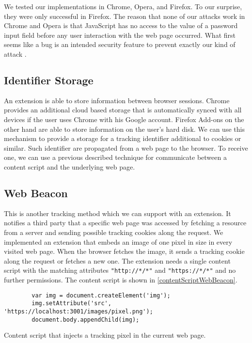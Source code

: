 	We tested our implementations in Chrome, Opera, and Firefox. To our surprise, they were only successful in Firefox. The reason that none of our attacks work in Chrome and Opera is that JavaScript has no access to the value of a password input field before any user interaction with the web page occurred. What first seems like a bug is an intended security feature to prevent exactly our kind of attack \cite{chromiumBlogPasswordInput}.
	
	
	
\subsection{Identifier Storage} 
	
	An extension is able to store information between browser sessions. Chrome provides an additional cloud based storage that is automatically synced with all devices if the user uses Chrome with his Google account. Firefox Add-ons on the other hand are able to store information on the user's hard disk. We can use this mechanism to provide a storage for a tracking identifier additional to cookies or similar. Such identifier are propagated from a web page to the browser. To receive one, we can use a previous described technique for communicate between a content script and the underlying web page. \\ %
	
	
	
\subsection{Web Beacon}
	
	This is another tracking method which we can support with an extension. It notifies a third party that a specific web page was accessed by fetching a resource from a server and sending possible tracking cookies along the request. We implemented an extension that embeds an image of one pixel in size in every visited web page. When the browser fetches the image, it sends a tracking cookie along the request or fetches a new one. The extension needs a single content script with the matching attributes \texttt{"http://*/*"} and \texttt{"https://*/*"} and no further permissions. The content script is shown in \autoref{contentScriptWebBeacon}.
	
	\begin{code}
		\begin{lstlisting}
		var img = document.createElement('img');
		img.setAttribute('src', 'https://localhost:3001/images/pixel.png');
		document.body.appendChild(img);
		\end{lstlisting}
		\caption{Content script that injects a tracking pixel in the current web page.}
		\label{contentScriptWebBeacon}
	\end{code}
	
